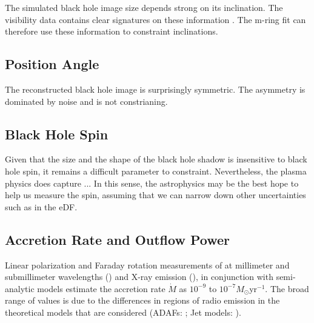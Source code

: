 
The simulated black hole image size depends strong on its inclination.  The visibility data contains clear signatures on these information \citep{PaperIV}.  The m-ring fit can therefore use these information to constraint inclinations.

\subsection{Position Angle}


The reconstructed black hole image is surprisingly symmetric.  The asymmetry is dominated by noise and is not constrianing.

\subsection{Black Hole Spin}


Given that the size and the shape of the black hole shadow is insensitive to black hole spin, it remains a difficult parameter to constraint.  Nevertheless, the plasma physics does capture ...   In this sense, the astrophysics may be the best hope to help us measure the spin, assuming that we can narrow down other uncertainties such as in the eDF.

\subsection{Accretion Rate and Outflow Power}


Linear polarization and Faraday rotation measurements of \sgra at millimeter and submillimeter wavelengths (\citealt{2000ApJ...538L.121A, 2000ApJ...545..842Q, 2003ApJ...588..331B, 2006ApJ...640..308M, 2006JPhCS..54..354M, 2006ApJ...646L.111M}) and X-ray emission  (\citealt{2003ApJ...591..891B, doi:10.1126/science.1240755}), in conjunction with semi-analytic models estimate the accretion rate $\dot{M}$ as $10^{-9}$ to $10^{-7} M_{\odot}$yr$^{-1}$. The broad range of values is due to the differences in regions of radio emission in the theoretical models that are considered (ADAFs: \citealt{1998ApJ...492..554N, Yuan_2003}; Jet models: \citealt{1993A&A...278L...1F, 2000A&A...362..113F}).

